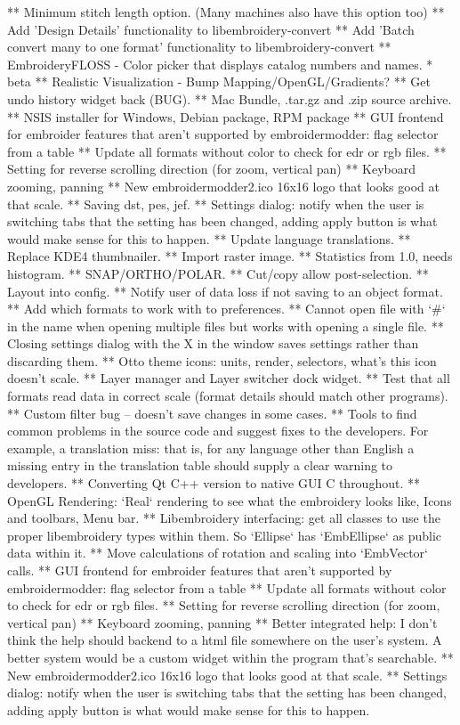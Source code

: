 \begin{itemize}
** Minimum stitch length option. (Many machines also have this option too)
** Add 'Design Details' functionality to libembroidery-convert
** Add 'Batch convert many to one format' functionality to libembroidery-convert
** EmbroideryFLOSS - Color picker that displays catalog numbers and names.
* beta
** Realistic Visualization - Bump Mapping/OpenGL/Gradients?
** Get undo history widget back (BUG).
** Mac Bundle, .tar.gz and .zip source archive.
** NSIS installer for Windows, Debian package, RPM package
** GUI frontend for embroider features that aren't
supported by embroidermodder: flag selector from a table
** Update all formats without color to check for edr or rgb files.
** Setting for reverse scrolling direction (for zoom, vertical pan)
** Keyboard zooming, panning
** New embroidermodder2.ico 16x16 logo that looks good at that scale.
** Saving dst, pes, jef.
** Settings dialog: notify when the user is switching tabs
that the setting has been changed, adding apply button is what would
make sense for this to happen.
** Update language translations.
** Replace KDE4 thumbnailer.
** Import raster image.
** Statistics from 1.0, needs histogram.
** SNAP/ORTHO/POLAR.
** Cut/copy allow post-selection.
** Layout into config.
** Notify user of data loss if not saving to an object format.
** Add which formats to work with to preferences.
** Cannot open file with `#` in the name when opening multiple
files but works with opening a single file.
** Closing settings dialog with the X in the window saves
settings rather than discarding them.
** Otto theme icons: units, render, selectors, what's
this icon doesn't scale.
** Layer manager and Layer switcher dock widget.
** Test that all formats read data in correct scale
(format details should match other programs).
** Custom filter bug -- doesn't save changes in some cases.
** Tools to find common problems in the source code and suggest fixes
to the developers. For example, a translation miss: that is, for any language
other than English a missing entry in the translation table should supply a
clear warning to developers.
** Converting Qt C++ version to native GUI C throughout.
** OpenGL Rendering: `Real` rendering to see what the embroidery
looks like, Icons and toolbars, Menu bar.
** Libembroidery interfacing: get all classes to use the proper
libembroidery types within them. So `Ellipse` has `EmbEllipse` as public
data within it.
** Move calculations of rotation and scaling into `EmbVector` calls.
** GUI frontend for embroider features that aren't supported by
embroidermodder: flag selector from a table
** Update all formats without color to check for edr or rgb files.
** Setting for reverse scrolling direction (for zoom, vertical pan)
** Keyboard zooming, panning
** Better integrated help: I don't think the help should backend to
a html file somewhere on the user's system. A better system would be a custom
widget within the program that's searchable.
** New embroidermodder2.ico 16x16 logo that looks good at that scale.
** Settings dialog: notify when the user is switching tabs that the
setting has been changed, adding apply button is what would make sense for
this to happen.
\end{itemize}


